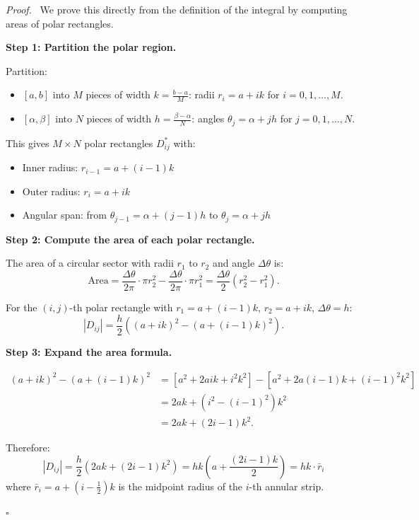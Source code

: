\documentclass[11pt]{report}
\renewenvironment{proof}[1][Proof]{\par\noindent\textit{#1.}\ }{\hfill$\square$\par\medskip}
\begin{document}
\begin{proof}
We prove this directly from the definition of the integral by computing areas of polar rectangles.

\textbf{Step 1: Partition the polar region.}

Partition:
\begin{itemize}
    \item $[a, b]$ into $M$ pieces of width $k = \frac{b-a}{M}$: radii $r_i = a + ik$ for $i = 0, 1, \ldots, M$.
    \item $[\alpha, \beta]$ into $N$ pieces of width $h = \frac{\beta - \alpha}{N}$: angles $\theta_j = \alpha + jh$ for $j = 0, 1, \ldots, N$.
\end{itemize}

This gives $M \times N$ polar rectangles $D_{ij}^*$ with:
\begin{itemize}
    \item Inner radius: $r_{i-1} = a + (i-1)k$
    \item Outer radius: $r_i = a + ik$
    \item Angular span: from $\theta_{j-1} = \alpha + (j-1)h$ to $\theta_j = \alpha + jh$
\end{itemize}

\textbf{Step 2: Compute the area of each polar rectangle.}

The area of a circular sector with radii $r_1$ to $r_2$ and angle $\Delta\theta$ is:
\[
\text{Area} = \frac{\Delta\theta}{2\pi} \cdot \pi r_2^2 - \frac{\Delta\theta}{2\pi} \cdot \pi r_1^2 = \frac{\Delta\theta}{2}(r_2^2 - r_1^2).
\]

For the $(i, j)$-th polar rectangle with $r_1 = a + (i-1)k$, $r_2 = a + ik$, $\Delta\theta = h$:
\[
|D_{ij}| = \frac{h}{2}\left( (a + ik)^2 - (a + (i-1)k)^2 \right).
\]

\textbf{Step 3: Expand the area formula.}

\begin{align*}
(a + ik)^2 - (a + (i-1)k)^2 &= \left[ a^2 + 2aik + i^2k^2 \right] - \left[ a^2 + 2a(i-1)k + (i-1)^2k^2 \right] \\
&= 2ak + \left( i^2 - (i-1)^2 \right) k^2 \\
&= 2ak + (2i - 1)k^2.
\end{align*}

Therefore:
\[
|D_{ij}| = \frac{h}{2}\left( 2ak + (2i-1)k^2 \right) = hk \left( a + \frac{(2i-1)k}{2} \right) = hk \cdot \bar{r}_i
\]
where $\bar{r}_i = a + (i - \frac{1}{2})k$ is the midpoint radius of the $i$-th annular strip.


\end{proof}
\end{document}
